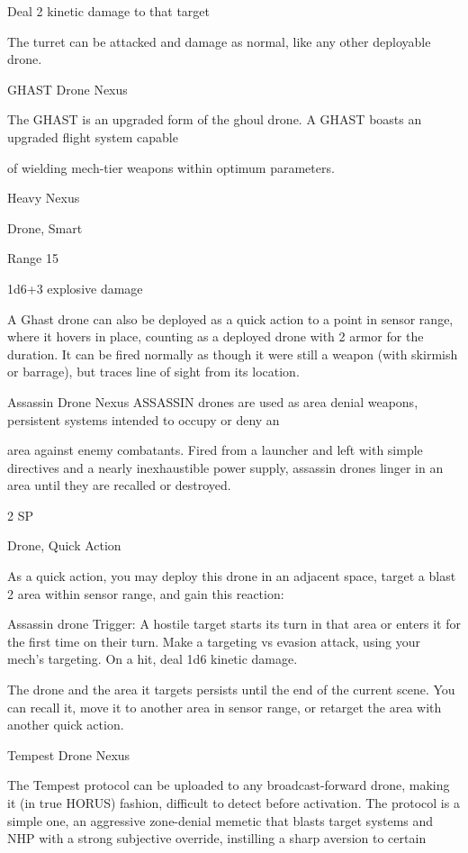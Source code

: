	        Deal 2 kinetic damage to that target

The turret can be attacked and damage as normal, like any other deployable drone.


GHAST Drone Nexus

The GHAST is an upgraded form of the ghoul drone. A GHAST boasts an upgraded flight system capable

of wielding mech-tier weapons within optimum parameters.

Heavy Nexus

Drone, Smart

Range 15

1d6+3 explosive damage


A Ghast drone can also be deployed as a quick action to a point in sensor range, where it hovers
in place, counting as a deployed drone with 2 armor for the duration. It can be fired normally as
though it were still a weapon (with skirmish or barrage), but traces line of sight from its location.





Assassin Drone Nexus
ASSASSIN drones are used as area denial weapons, persistent systems intended to occupy or deny an

area against enemy combatants. Fired from a launcher and left with simple directives and a nearly
inexhaustible power supply, assassin drones linger in an area until they are recalled or destroyed.

2 SP

Drone, Quick Action

As a quick action, you may deploy this drone in an adjacent space, target a blast 2 area within
sensor range, and gain this reaction:

         Assassin drone
         Trigger: A hostile target starts its turn in that area or enters it for the first time on their turn.
         Make a targeting vs evasion attack, using your mech’s targeting. On a hit, deal 1d6 kinetic
         damage.

The drone and the area it targets persists until the end of the current scene. You can recall it,
move it to another area in sensor range, or retarget the area with another quick action.


Tempest Drone Nexus

The Tempest protocol can be uploaded to any broadcast-forward drone, making it (in true HORUS) fashion,
difficult to detect before activation. The protocol is a simple one, an aggressive zone-denial memetic that
blasts target systems and NHP with a strong subjective override, instilling a sharp aversion to certain

